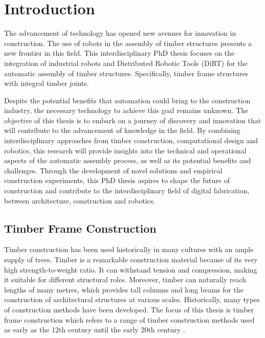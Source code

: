 \chapter{Introduction}
\label{chapter:introduction}

The advancement of technology has opened new avenues for innovation in construction.
The use of robots in the assembly of timber structures presents a new frontier in this field.
This interdisciplinary PhD thesis focuses on the integration of industrial robots and Distributed Robotic Tools (DiRT) for the automatic assembly of timber structures.
Specifically, timber frame structures with integral timber joints. 

Despite the potential benefits that automation could bring to the construction industry, the necessary technology to achieve this goal remains unknown. The objective of this thesis is to embark on a journey of discovery and innovation that will contribute to the advancement of knowledge in the field.
By combining interdisciplinary approaches from timber construction, computational design and robotics, this research will provide insights into the technical and operational aspects of the automatic assembly process, as well as its potential benefits and challenges.
Through the development of novel solutions and empirical construction experiments, this PhD thesis aspires to shape the future of construction and contribute to the interdisciplinary field of digital fabrication, between architecture, construction and robotics.

\section{Timber Frame Construction}
\label{section:introduction-timber-frame-construction}

Timber construction has been used historically in many cultures with an ample supply of trees.
Timber is a remarkable construction material because of its very high strength-to-weight ratio.
It can withstand tension and compression, making it suitable for different structural roles. Moreover, timber can naturally reach lengths of many metres, which provides tall columns and long beams for the construction of architectural structures at various scales.
Historically, many types of construction methods have been developed. The focus of this thesis is timber frame construction which refers to a range of timber construction methods used as early as the 12th century until the early 20th century \parencite{sobonTimberFrameConstruction1984}.

